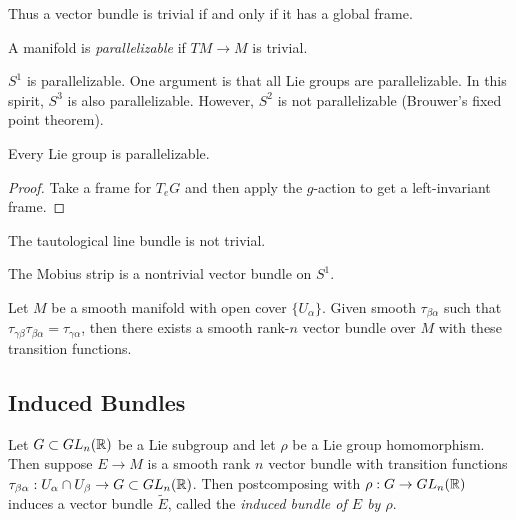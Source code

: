 \documentclass[twoside, 10pt]{article}
\begin{document}
    Thus a vector bundle is trivial if and only if it has a global frame.

    \begin{defn}
        A manifold is \textit{parallelizable} if $TM \to M$ is trivial.
    \end{defn}

    \begin{exm}
        $S^1$ is parallelizable. One argument is that all Lie groups are parallelizable. In this spirit, $S^3$ is also parallelizable. However, $S^2$ is not parallelizable (Brouwer's fixed point theorem).
    \end{exm}

    \begin{prop}
        Every Lie group is parallelizable.
    \end{prop}

    \begin{proof}
        Take a frame for $T_eG$ and then apply the $g$-action to get a left-invariant frame.
    \end{proof}

    \begin{exm}
        The tautological line bundle is not trivial.
    \end{exm}

    \begin{exm}
        The Mobius strip is a nontrivial vector bundle on $S^1$.
    \end{exm}

    \begin{thm}
        Let $M$ be a smooth manifold with open cover $\{U_{\alpha}\}$. Given smooth $\tau_{\beta\alpha}$ such that $\tau_{\gamma\beta}\tau_{\beta\alpha} = \tau_{\gamma\alpha}$, then there exists a smooth rank-$n$ vector bundle over $M$ with these transition functions.
    \end{thm}

    \subsection{Induced Bundles}%
    \label{sub:induced_bundles}
    
    Let $G \subset GL_n(\mathbb{R})$ be a Lie subgroup and let $\rho$ be a Lie group homomorphism. Then suppose $E \to M$ is a smooth rank $n$ vector bundle with transition functions $\tau_{\beta\alpha}: U_{\alpha} \cap U_{\beta} \to G \subset GL_n(\mathbb{R})$. Then postcomposing with $\rho:G \to GL_n(\mathbb{R})$ induces a vector bundle $\widetilde{E}$, called the \textit{induced bundle of $E$ by $\rho$}.
\end{document}

